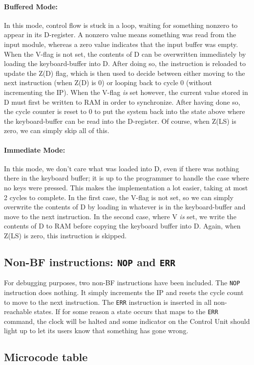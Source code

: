 \paragraph{Buffered Mode:}
In this mode, control flow is stuck in a loop, waiting for something nonzero to appear in its D-register. A nonzero value means something was read from the input module, whereas a zero value indicates that the input buffer was empty. When the V-flag is not set, the contents of D can be overwritten immediately by loading the keyboard-buffer into D. After doing so, the instruction is reloaded to update the Z(D) flag, which is then used to decide between either moving to the next instruction (when Z(D) is 0) or looping back to cycle 0 (without incrementing the IP). When the V-flag \emph{is} set however, the current value stored in D must first be written to RAM in order to synchronize.  After having done so, the cycle counter is reset to 0 to put the system back into the state above where the keyboard-buffer can be read into the D-register. Of course, when Z(LS) is zero, we can simply skip all of this.

\paragraph{Immediate Mode:}
In this mode, we don't care what was loaded into D, even if there was nothing there in the keyboard buffer; it is up to the programmer to handle the case where no keys were pressed. This makes the implementation a lot easier, taking at most 2 cycles to complete. In the first case, the V-flag is not set, so we can simply overwrite the contents of D by loading in whatever is in the keyboard-buffer and move to the next instruction. In the second case, where V \emph{is} set, we write the contents of D to RAM before copying the keyboard buffer into D. Again, when Z(LS) is zero, this instruction is skipped.
  
\subsection{Non-BF instructions: \texttt{NOP} and \texttt{ERR}}
For debugging purposes, two non-BF instructions have been included. The \texttt{NOP} instruction does nothing. It simply increments the IP and resets the cycle count to move to the next instruction. The \texttt{ERR} instruction is inserted in all non-reachable states. If for some reason a state occurs that maps to the \texttt{ERR} command, the clock will be halted and some indicator on the Control Unit should light up to let its users know that something has gone wrong.

\subsection{Microcode table}





